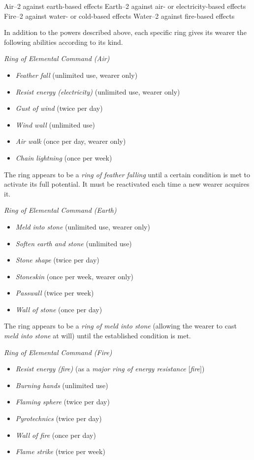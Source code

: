 Air--2 against earth-based effects
Earth--2 against air- or electricity-based effects
Fire--2 against water- or cold-based effects
Water--2 against fire-based effects

				
In addition to the powers described above, each specific ring gives its wearer the following abilities according to its kind.
				
\textit{Ring of Elemental Command (Air)}
				\begin{itemize}\item  \textit{Feather fall }(unlimited use, wearer only)
				\item  \textit{Resist energy (electricity) }(unlimited use, wearer only)
				\item  \textit{Gust of wind }(twice per day)
				\item  \textit{Wind wall }(unlimited use)
				\item  \textit{Air walk }(once per day, wearer only)
				\item  \textit{Chain lightning }(once per week)
\end{itemize}
				
The ring appears to be a \textit{ring of feather falling }until a certain condition is met to activate its full potential. It must be reactivated each time a new wearer acquires it.
				
\textit{Ring of Elemental Command (Earth)}
				\begin{itemize}\item  \textit{Meld into stone }(unlimited use, wearer only) 
				\item  \textit{Soften earth and stone }(unlimited use)
				\item  \textit{Stone shape }(twice per day)
				\item  \textit{Stoneskin }(once per week, wearer only)
				\item  \textit{Passwall }(twice per week)
				\item  \textit{Wall of stone }(once per day)
\end{itemize}
				
The ring appears to be a \textit{ring of meld into stone }(allowing the wearer to cast \textit{meld into stone }at will) until the established condition is met.
				
\textit{Ring of Elemental Command (Fire)}
				\begin{itemize}\item  \textit{Resist energy (fire) }(as a \textit{major ring of energy resistance \mbox{$[$}fire\mbox{$]$}})
				\item  \textit{Burning hands }(unlimited use)
				\item  \textit{Flaming sphere }(twice per day)
				\item  \textit{Pyrotechnics }(twice per day)
				\item  \textit{Wall of fire }(once per day)
				\item  \textit{Flame strike }(twice per week)
\end{itemize}
				
